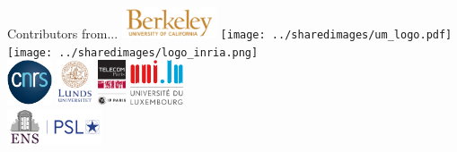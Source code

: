 \documentclass[unknownkeysallowed]{beamer}
\begin{document}
\begin{frame}{Contributors from...}
    \centering
    \includegraphics[height=35px]{../sharedimages/logo_berkeley.png} \hspace{1mm}
    \texttt{[image: ../sharedimages/um\_logo.pdf]} \hspace{1mm}
    \texttt{[image: ../sharedimages/logo\_inria.png]} \hspace{1mm} \\[7mm]
    \includegraphics[height=50px]{../sharedimages/logo_cnrs.pdf} \hspace{5mm}
    \includegraphics[height=50px]{../sharedimages/logo_lund} \hspace{5mm}
    \includegraphics[height=50px]{../sharedimages/logo_telecom.pdf} \hspace{5mm}
    \includegraphics[height=50px]{../sharedimages/logo_univ_luxembourg.pdf} \\[4mm]
    \includegraphics[height=40px]{../sharedimages/logo_ens.png}
\end{frame}
\end{document}
